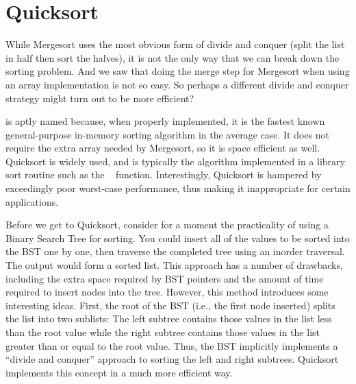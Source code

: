 \section{Quicksort}
\label{QuickSort}

While Mergesort uses the most obvious form of divide and conquer
(split the list in half then sort the halves), it is not the only way
that we can break down the sorting problem.
And we saw that doing the merge step for Mergesort when using an array
implementation is not so easy.
So perhaps a different divide and conquer strategy might turn out to
be more efficient?


 is aptly named because, when properly implemented, it
is the fastest known general-purpose in-memory sorting algorithm in
the average case.
It does not require the extra array needed by Mergesort, so it is
space efficient as well.
Quicksort is widely used, and is typically the algorithm implemented
in a library sort routine such as the \UNIX\ 
function.
Interestingly, Quicksort is hampered by exceedingly poor worst-case
performance, thus making it inappropriate for certain applications.

Before we get to Quicksort, consider for a moment the practicality
of using a Binary Search Tree for sorting.
You could insert all of the values to be sorted into the BST
one by one, then traverse the completed tree using an inorder traversal.
The output would form a sorted list.
This approach has a number of drawbacks, including the extra space
required by BST pointers and the amount of time required to insert
nodes into the tree.
However, this method introduces some interesting ideas.
First, the root of the BST (i.e., the first node inserted) splits the
list into two sublists:
The left subtree contains those values in the
list less than the root value while the right subtree contains those
values in the list greater than or equal to the root value.
Thus, the BST implicitly implements a ``divide and conquer'' approach
to sorting the left and right subtrees.
Quicksort implements this concept in a much more efficient
way.

